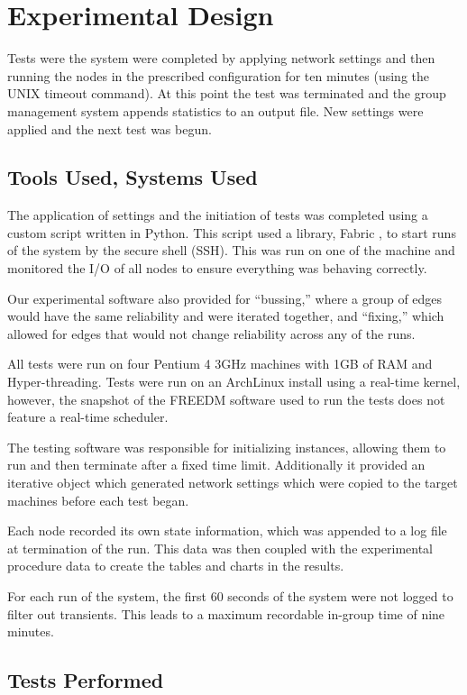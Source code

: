 \chapter{Experimental Design}

Tests were the system were completed by applying network settings and then running the nodes in the prescribed configuration for ten minutes (using the UNIX timeout command). At this point the test was terminated and the group management system appends statistics to an output file. New settings were applied and the next test was begun.

\section{Tools Used, Systems Used}

The application of settings and the initiation of tests was completed using a custom script written in Python. This script used a library, Fabric \cite{FABRIC}, to start runs of the system by the secure shell (SSH). This was run on one of the machine and monitored the I/O of all nodes to ensure everything was behaving correctly.

Our experimental software also provided for ``bussing,'' where a group of edges would
have the same reliability and were iterated together, and ``fixing,'' which allowed for edges that would not change reliability across any of the runs.

All tests were run on four Pentium 4 3GHz machines with 1GB of RAM and Hyper-threading. Tests were run on an ArchLinux install using a real-time kernel, however, the snapshot of the FREEDM software used to run the tests does not feature a real-time scheduler.

The testing software was responsible for initializing instances, allowing them to run and then terminate after a fixed time limit. Additionally it provided an iterative object which generated network settings which were copied to the target machines before each test began.

Each node recorded its own state information, which was appended to a log file at termination of the run. This data was then coupled with the experimental procedure data to create the tables and charts in the results.

For each run of the system, the first 60 seconds of the system were not logged to filter out transients. This leads to a maximum recordable in-group time of nine minutes.
\section{Tests Performed}

